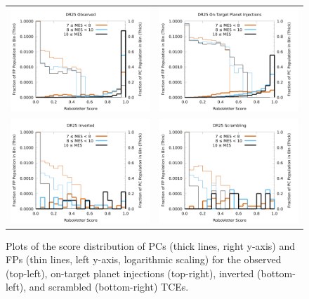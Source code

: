\begin{figure}[htb]
\centering
\begin{tabular}{cc}
\includegraphics[width=0.5\linewidth]{Scores-OBS.png} &
\includegraphics[width=0.5\linewidth]{Scores-INJ1.png} \\
\includegraphics[width=0.5\linewidth]{Scores-INV.png} &
\includegraphics[width=0.5\linewidth]{Scores-SCR1.png} \\
\end{tabular}
\caption{Plots of the score distribution of PCs (thick lines, right y-axis) and FPs (thin lines, left y-axis, logarithmic scaling) for the observed (top-left), on-target planet injections (top-right), inverted (bottom-left), and scrambled (bottom-right) TCEs.}
\label{score-fig-2}
\end{figure}

